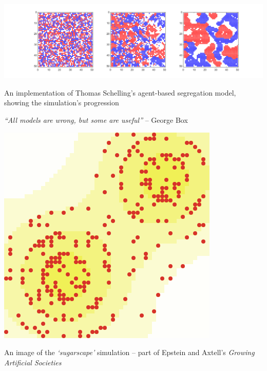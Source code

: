 \documentclass[nofonts,nols,justified,nobib]{tufte-book}
\begin{document}
\begin{marginfigure}
\includegraphics[width=\textwidth]{img/1/schelling-segregation.png}
\caption{An implementation of Thomas Schelling's agent-based segregation model, showing the simulation's progression \cite{schelling_dynamic_1971} }
\end{marginfigure}

\begin{flushright}
\emph{``All models are wrong, but some are useful''}
-- George Box
\end{flushright}


\begin{marginfigure}
\includegraphics[width=\textwidth]{img/1/sugarscape.png}
\caption{An image of the \emph{`sugarscape'} simulation -- part of Epstein and Axtell's \emph{Growing Artificial Societies} \cite{epstein_growing_1996-1}}
\end{marginfigure}
\end{document}
